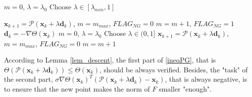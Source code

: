 \begin{algorithm}[H]
	\begin{algorithmic}[1]

		\STATE $ m = 0 $, $ \lambda = \lambda_{0} $ 
		\STATE Choose $ \lambda \in [\lambda_{min}, 1] $

		\STATE	$ \textbf{x}_{k+1} = \mathcal{P}(\textbf{x}_k + \lambda \textbf{d}_k)$,  $m = m_{max} $, $ FLAG_{NG}= 0 $
		\ELSE
		\STATE $ m = m + 1$, $FLAG_{NG} = 1 $
		\ENDIF
		\ENDWHILE
		\ELSE
		\STATE $ \textbf{d}_k = - \nabla \Theta (\textbf{x}_k) $
		\STATE $ m=0 $, $ \lambda = \lambda_0 $
		\STATE Choose $ \lambda \in  (0, 1]  $
		\STATE	$ \textbf{x}_{k+1} = \mathcal{P}(\textbf{x}_k + \lambda \textbf{d}_k)$,  $m = m_{max} $, $ FLAG_{NG}= 0 $
		\ELSE
		\STATE $ m = m + 1$
		\ENDIF
		\ENDWHILE
		\ENDIF
		\ENDFOR
	\end{algorithmic}
\end{algorithm}
According to Lemma \ref{lem_descent}, the first part of \eqref{ineqPG}, that is $\Theta(\mathcal{P}(\textbf{x}_k+ \lambda \textbf{d}_k)) \leq \Theta (\textbf{x}_k)  $, should be always verified. Besides, the "task" of the second part, $ \sigma \nabla \Theta(\textbf{x}_k)^T (\mathcal{P}(\textbf{x}_k + \lambda \textbf{d}_k)- \textbf{x}_k) $, that is always negative, is to ensure that the new point makes the norm of $ F $ smaller "enough".

